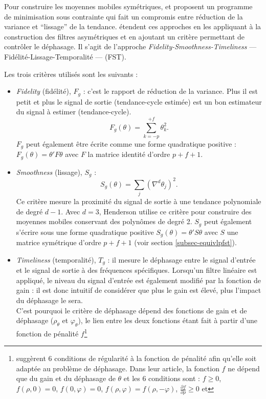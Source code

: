 \documentclass[
  11pt,
  french,
  a4paper]{article}
\newcommand\1{\mathds{1}}
\begin{document}
Pour construire les moyennes mobiles symétriques, \textcite{GrunRehommeLadiray1994} et \textcite{GrayThomson1996} proposent un programme de minimisation sous contrainte qui fait un compromis entre réduction de la variance et ``lissage'' de la tendance.
\textcite{ch15HBSA} étendent ces approches en les appliquant à la construction des filtres asymétriques et en ajoutant un critère permettant de contrôler le déphasage.
Il s'agit de l'approche \emph{Fidelity-Smoothness-Timeliness} --- Fidélité-Lissage-Temporalité --- (FST).

Les trois critères utilisés sont les suivants :

\begin{itemize}
\item
  \emph{Fidelity} (fidélité), \(F_g\) : c'est le rapport de réduction de la variance.
  Plus il est petit et plus le signal de sortie (tendance-cycle estimée) est un bon estimateur du signal à estimer (tendance-cycle).
  \[
  F_g(\theta) = \sum_{k=-p}^{+f}\theta_{k}^{2}.
  \]
  \(F_g\) peut également être écrite comme une forme quadratique positive : \(F_g(\theta)=\theta'F\theta\) avec \(F\) la matrice identité d'ordre \(p+f+1\).
\item
  \emph{Smoothness} (lissage), \(S_g\) :
  \[
  S_g(\theta) = \sum_{j}(\nabla^{d}\theta_{j})^{2}.
  \]
  Ce critère mesure la proximité du signal de sortie à une tendance polynomiale de degré \(d-1\).
  Avec \(d=3\), Henderson utilise ce critère pour construire des moyennes mobiles conservant des polynômes de degré 2.
  \(S_g\) peut également s'écrire sous une forme quadratique positive \(S_g(\theta)=\theta'S\theta\) avec \(S\) une matrice symétrique d'ordre \(p+f+1\) (voir section \ref{subsec-equivlpfst}).
\item
  \emph{Timeliness} (temporalité), \(T_g\) : il mesure le déphasage entre le signal d'entrée et le signal de sortie à des fréquences spécifiques.
  Lorsqu'un filtre linéaire est appliqué, le niveau du signal d'entrée est également modifié par la fonction de gain : il est donc intuitif de considérer que plus le gain est élevé, plus l'impact du déphasage le sera.\\
  C'est pourquoi le critère de déphasage dépend des fonctions de gain et de déphasage (\(\rho_\theta\) et \(\varphi_{\theta}\)), le lien entre les deux fonctions étant fait à partir d'une fonction de pénalité \(f\)\footnote{
    \textcite{ch15HBSA} suggèrent 6 conditions de régularité à la fonction de pénalité afin qu'elle soit adaptée au problème de déphasage.
    Dans leur article, la fonction \(f\) ne dépend que du gain et du déphasage de \(\theta\) et les 6 conditions sont : \(f \geq 0\), \(f\left(\rho,0\right)=0\), \(f\left(0,\varphi\right)=0\), \(f\left(\rho,\varphi\right)=f\left(\rho,-\varphi\right)\), \(\frac{\partial f}{\partial \rho} \geq 0\) et
}
\end{itemize}
\end{document}

